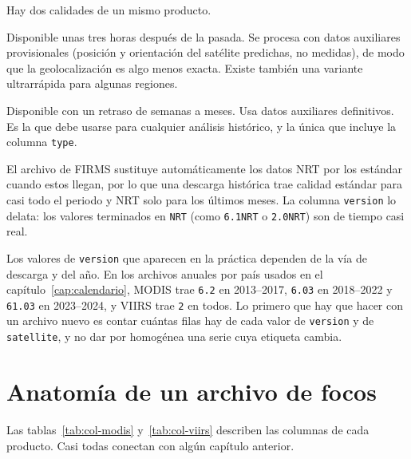 Hay dos calidades de un mismo producto.

\begin{description}[leftmargin=1.2em,style=nextline]
  \item[Tiempo casi real (NRT).] Disponible unas tres horas después de la pasada. Se procesa con
  datos auxiliares provisionales (posición y orientación del satélite predichas, no medidas), de
  modo que la geolocalización es algo menos exacta. Existe también una variante ultrarrápida para
  algunas regiones.
  \item[Calidad estándar o científica.] Disponible con un retraso de semanas a meses. Usa datos
  auxiliares definitivos. Es la que debe usarse para cualquier análisis histórico, y la única
  que incluye la columna \texttt{type}.
\end{description}

El archivo de FIRMS sustituye automáticamente los datos NRT por los estándar cuando estos
llegan, por lo que una descarga histórica trae calidad estándar para casi todo el periodo y NRT
solo para los últimos meses. La columna \texttt{version} lo delata: los valores terminados en
\texttt{NRT} (como \texttt{6.1NRT} o \texttt{2.0NRT}) son de tiempo casi real.

\begin{atencion}
Los valores de \texttt{version} que aparecen en la práctica dependen de la vía de descarga y
del año. En los archivos anuales por país usados en el capítulo~\ref{cap:calendario}, MODIS
trae \texttt{6.2} en 2013--2017, \texttt{6.03} en 2018--2022 y \texttt{61.03} en 2023--2024,
y VIIRS trae \texttt{2} en todos. Lo primero que hay que hacer con un archivo nuevo es contar
cuántas filas hay de cada valor de \texttt{version} y de \texttt{satellite}, y no dar por
homogénea una serie cuya etiqueta cambia.
\end{atencion}

\section{Anatomía de un archivo de focos}

Las tablas~\ref{tab:col-modis} y~\ref{tab:col-viirs} describen las columnas de cada producto.
Casi todas conectan con algún capítulo anterior.

